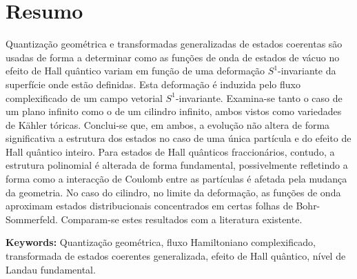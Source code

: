 \documentclass[notas.tex]{subfiles} 				%
\begin{document}
\section*{Resumo}
Quantização geométrica e transformadas generalizadas de estados coerentas são usadas de forma a determinar como as funções de onda de estados de vácuo no efeito de Hall quântico variam em função de uma deformação $S^1$-invariante da superfície onde estão definidas. Esta deformação é induzida pelo fluxo complexificado de um campo vetorial $S^1$-invariante. Examina-se tanto o caso de um plano infinito como o de um cilindro infinito, ambos vistos como variedades de Kähler tóricas. Conclui-se que, em ambos, a evolução não altera de forma significativa a estrutura dos estados no caso de uma única partícula e do efeito de Hall quântico inteiro. Para estados de Hall quânticos fraccionários, contudo, a estrutura polinomial é alterada de forma fundamental, possivelmente refletindo a forma como a interacção de Coulomb entre as partículas é afetada pela mudança da geometria. No caso do cilindro, no limite da deformação, as funções de onda aproximam estados distribucionais concentrados em certas folhas de Bohr-Sommerfeld. Comparam-se estes resultados com a literatura existente.

\bigskip
{\bfseries Keywords:} Quantização geométrica, fluxo Hamiltoniano complexificado, transformada de estados coerentes generalizada, efeito de Hall quântico, nível de Landau fundamental.
\end{document}
